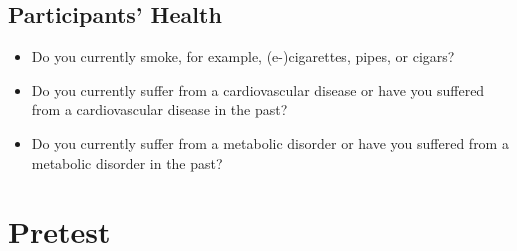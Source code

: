 \documentclass[smallcondensed]{svjour3}
\begin{document}
\subsection*{Participants' Health}
%
\begin{itemize}
   \item Do you currently smoke, for example, (e-)cigarettes, pipes, or cigars?
   \item Do you currently suffer from a cardiovascular disease or have you suffered from a cardiovascular disease in the past?
   \item Do you currently suffer from a metabolic disorder or have you suffered from a metabolic disorder in the past?
\end{itemize}
\par
%
\section{Pretest}\label{sec:app_pretest}
%
\end{document}
